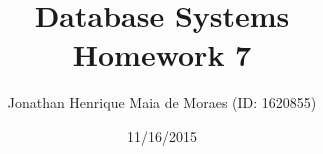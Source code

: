 \title{Database Systems \\ Homework 7}
\author{Jonathan Henrique Maia de Moraes (ID: 1620855)}
\date{11/16/2015}
\maketitle
